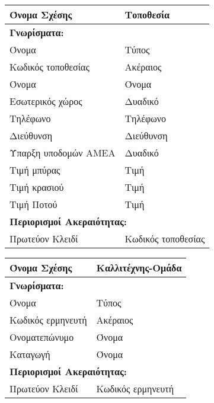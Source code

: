 \begin{tabular}{|p{6cm}|p{8cm}|}
  \hline
  Όνομα Σχέσης         & Τοποθεσία                         \\ \hline
  \multicolumn{2}{|l|}{\textbf{Γνωρίσματα:}}               \\ \hline
  Όνομα                & Τύπος                             \\ \hline
  Κωδικός τοποθεσίας   & Ακέραιος                          \\ \hline
  Όνομα                & Όνομα                             \\ \hline
  Εσωτερικός χώρος     & Δυαδικό                           \\ \hline
  Τηλέφωνο             & Τηλέφωνο                          \\ \hline
  Διεύθυνση            & Διεύθυνση                         \\ \hline
  Ύπαρξη υποδομών ΑΜΕΑ & Δυαδικό                           \\ \hline
  Τιμή μπύρας          & Τιμή                              \\ \hline
  Τιμή κρασιού         & Τιμή                              \\ \hline
  Τιμή Ποτού           & Τιμή                              \\ \hline
  \multicolumn{2}{|l|}{\textbf{Περιορισμοί Ακεραιότητας:}} \\ \hline
  Πρωτεύον Κλειδί      & Κωδικός τοποθεσίας                \\ \hline
\end{tabular}


\begin{tabular}{|p{6cm}|p{8cm}|}
  \hline
  Όνομα Σχέσης        & Καλλιτέχνης-Ομάδα                   \\ \hline
  \multicolumn{2}{|l|}{\textbf{Γνωρίσματα:}}               \\ \hline
  Όνομα               & Τύπος                              \\ \hline
  Κωδικός ερμηνευτή   & Ακέραιος                           \\ \hline
  Ονοματεπώνυμο       & Όνομα                              \\ \hline
  Καταγωγή            & Όνομα                              \\ \hline
  \multicolumn{2}{|l|}{\textbf{Περιορισμοί Ακεραιότητας:}} \\ \hline
  Πρωτεύον Κλειδί     & Κωδικός ερμηνευτή                  \\ \hline
\end{tabular}

